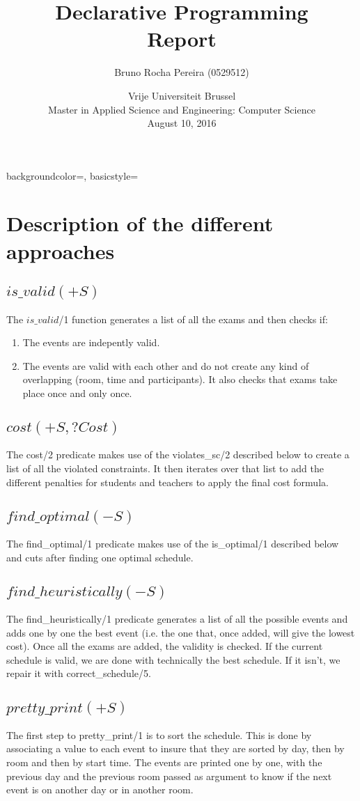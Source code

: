 \documentclass[a4paper]{article}
\title{Declarative Programming \\ Report}
\author{ Bruno Rocha Pereira (0529512)}
\date{Vrije Universiteit Brussel\\Master in Applied Science and Engineering: Computer Science\\ August 10, 2016}
\begin{document}
\maketitle
{}
{
    backgroundcolor=\color{black},
    basicstyle=\scriptsize\color{white}\ttfamily
}
\section{Description of the different approaches}
\subsection{$is\_valid(+S)$}
The $is\_valid$/1 function generates a list of all the exams and then checks if:
\begin{enumerate}
\item The events are indepently valid.
\item The events are valid with each other and do not create any kind of overlapping (room, time and participants).
It also checks that exams take place once and only once.
\end{enumerate}
\subsection{$cost(+S, ?Cost)$}
The cost/2 predicate makes use of the violates\_sc/2 described below to create a list of all the violated constraints. It then iterates over that list to add the different penalties for students and teachers to apply the final cost formula.
\subsection{$find\_optimal(-S)$}
The find\_optimal/1 predicate makes use of the is\_optimal/1 described below and cuts after finding one optimal schedule.
\subsection{$find\_heuristically(-S)$}
The find\_heuristically/1 predicate generates a list of all the possible events and adds one by one the best event (i.e. the one that, once added, will give the lowest cost). Once all the exams are added, the validity is checked. If the current schedule is valid, we are done with technically the best schedule. If it isn't, we repair it with correct\_schedule/5.
\subsection{$pretty\_print(+S)$}
The first step to pretty\_print/1 is to sort the schedule. This is done by associating a value to each event to insure that they are sorted by day, then by room and then by start time. The events are printed one by one, with the previous day and the previous room passed as argument to know if the next event is on another day or in another room.
\end{document}
